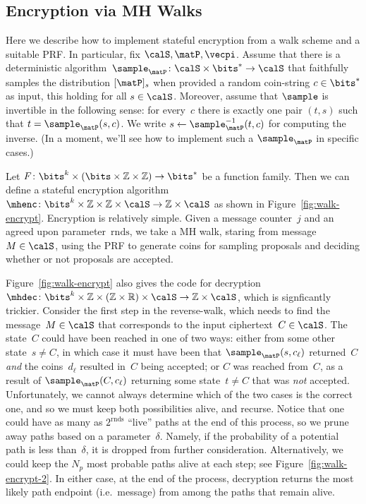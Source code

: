 \subsection{Encryption via MH Walks}
Here we describe how to implement stateful encryption
from a walk scheme and a suitable PRF.  In particular, fix
$\calS,\matP,\vecpi$. %
Assume that there is a deterministic
algorithm~$\sample_{\matP}\colon\calS\times\bits^*\to\calS$ that faithfully samples
the distribution $[\matP]_s$ when provided a random coin-string $c\in\bits^*$ as input,
this holding for all $s \in \calS$.
Moreover, assume that $\sample$ is invertible in the following sense:
for every~$c$ there is exactly one pair $(t,s)$ such that $t=\sample_\matP(s,c)$. 
We write $s \gets \sample_\matP^{-1}(t,c)$ for computing the inverse.  (In a moment, we'll see how to implement such a $\sample_\matP$ in specific cases.)

Let $F\colon \bits^k \times (\bits \times \mathbb{Z} \times \mathbb{Z}) \to\bits^*$ 
be a function family.  Then we can define a stateful encryption algorithm $\mhenc \colon \bits^k \times \mathbb{Z} \times \mathbb{Z} \times \calS \to \mathbb{Z} \times \calS$ as shown in Figure~\ref{fig:walk-encrypt}.
Encryption is relatively simple.  Given a message counter~$j$ and an agreed upon parameter~$\mathrm{rnds}$, we take a MH walk, staring from message $M\in\calS$, using the PRF to generate coins for sampling proposals and deciding whether or not proposals are accepted.

Figure~\ref{fig:walk-encrypt} also gives the code for decryption
$\mhdec\colon \bits^k \times \mathbb{Z} \times
(\mathbb{Z}\times\mathbb{R}) \times \calS \to \mathbb{Z} \times
\calS$, which is signficantly trickier.  Consider the first step in
the reverse-walk, which needs to find the message~$M \in \calS$ that
corresponds to the input ciphertext~$C \in \calS$.  The state~$C$
could have been reached in one of two ways: either from some other
state~$s \neq C$, in which case it must have been that
$\sample_\matP(s,c_\ell)$ returned~$C$ \textit{and} the coins~$d_\ell$
resulted in~$C$ being accepted; or $C$ was reached from~$C$, as a
result of $\sample_\matP(C,c_\ell)$ returning some state~$t \neq C$
that was \textit{not} accepted.  Unfortunately, we cannot always
determine which of the two cases is the correct one, and so we must
keep both possibilities alive, and recurse.  Notice that one could
have as many as $2^{\mathrm{rnds}}$ ``live'' paths at the end of this
process, so we prune away paths based on a parameter~$\delta$.
Namely, if the probability of a potential path is less than~$\delta$,
it is dropped from further consideration.  Alternatively, we could
keep the $N_p$ most probable paths alive at each step; see
Figure~\ref{fig:walk-encrypt-2}.  
In either case, at the end of the process, decryption returns the most likely path endpoint (i.e.\ message) from among the paths that remain alive.


